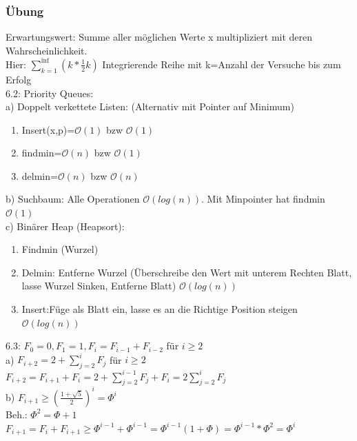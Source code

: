 \documentclass[a4paper]{article}
\newcommand{\oh}[1]{$\mathcal{O}(#1)$}
\begin{document}
\subsubsection{Übung}
Erwartungswert: Summe aller möglichen Werte x multipliziert mit deren Wahrscheinlichkeit.\\
Hier: $\sum_{k=1}^{\inf}(k*\frac{1}{2}k)$ Integrierende Reihe mit k=Anzahl der Versuche bis zum Erfolg\\
6.2: Priority Queues:\\
a) Doppelt verkettete Listen: (Alternativ mit Pointer auf Minimum)\begin{enumerate}
\item Insert(x,p)=\oh{1} bzw \oh{1}
\item findmin=\oh{n} bzw \oh{1}
\item delmin=\oh{n} bzw \oh{n}
\end{enumerate}
b) Suchbaum: Alle Operationen \oh{log(n)}. Mit Minpointer hat findmin \oh{1}\\
c) Binärer Heap (Heapsort): \begin{enumerate}
\item Findmin (Wurzel)
\item Delmin: Entferne Wurzel (Überschreibe den Wert mit unterem Rechten Blatt, lasse Wurzel Sinken, Entferne Blatt) \oh{log(n)}
\item Insert:Füge als Blatt ein, lasse es an die Richtige Position steigen \oh{log(n)}
\end{enumerate}	
6.3: $F_0=0,F_1=1,F_i=F_{i-1}+F_{i-2}$ für $i\geq 2$\\
a) $F_{i+2} = 2 + \sum_{j=2}^i F_j$ für $i\geq 2$\\
$F_{i+2} =  F_{i+1} +F_i = 2+\sum_{j=2}^{i-1} F_j + F_i = 2 \sum_{j=2}^i F_j$\\
b) $F_{i+1} \geq (\frac{1+\sqrt{5}}{2})^i=\Phi^i$\\
Beh.: $\Phi^2 = \Phi+1$\\
$F_{i+1} = F_i + F_{i+1} \geq \Phi^{i-1}+\Phi^{i-1}=\Phi^{i-1}(1+\Phi)=\Phi^{i-1}*\Phi^2 = \Phi^i$\\
\end{document}
